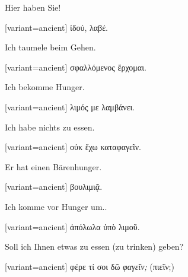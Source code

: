 Hier haben Sie!

\switchcolumn

\begin{greek}[variant=ancient]%
ἰδού, λαβέ.

\end{greek}%
\switchcolumn*

Ich taumele beim Gehen.

\switchcolumn

\begin{greek}[variant=ancient]%
σφαλλόμενος ἔρχομαι.

\end{greek}%
\indent Ich bekomme Hunger.

\switchcolumn

\begin{greek}[variant=ancient]%
λιμός με λαμβάνει.

\end{greek}%
\switchcolumn*

Ich habe nichts zu essen.

\switchcolumn

\begin{greek}[variant=ancient]%
οὐκ ἔχω καταφαγεῖν.

\end{greek}%
\switchcolumn*

Er hat einen Bärenhunger.

\switchcolumn

\begin{greek}[variant=ancient]%
βουλιμιᾷ.

\end{greek}%
\switchcolumn*

Ich komme vor Hunger um..

\switchcolumn

\begin{greek}[variant=ancient]%
ἀπόλωλα ὑπὸ λιμοῦ.

\end{greek}%
\switchcolumn*

Soll ich Ihnen etwas zu essen (zu trinken) geben?

\switchcolumn

\begin{greek}[variant=ancient]%
φέρε τί σοι δῶ \emph{φαγεῖν;} (πιεῖν;)

\end{greek}%
\switchcolumn*


